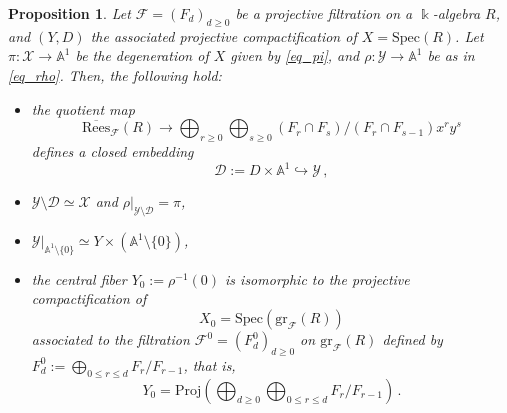 \documentclass[12pt,letterpaper, reqno]{amsart}
\newtheorem{proposition}[theorem]{Proposition}
\theoremstyle{defstyle} \newtheorem{definition}[theorem]{Definition}
\theoremstyle{remark}
\numberwithin{equation}{section}
\numberwithin{figure}{section}
\newcommand{\cF} {\mathcal{F}}
\newcommand{\Spec} {\mathrm{Spec}}
\newcommand{\Proj} {\mathrm{Proj}}
\newcommand{\gr} {\mathrm{gr}}
\newcommand{\kk} {\Bbbk}
\newcommand{\A} {\mathbb{A}}
\newcommand{\cY} {\mathcal{Y}}
\newcommand{\cD} {\mathcal{D}}
\newcommand{\cX} {\mathcal{X}}
\begin{document}
\begin{proposition} \label{prop_degeneration}
Let $\cF=(F_d)_{d\geq 0}$ be a projective filtration on a $\kk$-algebra $R$, and $(Y,D)$ the associated projective compactification of $X=\Spec(R)$. Let $\pi:\cX \rightarrow \A^1$ be the degeneration of $X$ given by \eqref{eq_pi}, and $\rho: \cY \rightarrow \A^1$ be as in \eqref{eq_rho}. Then, the following hold:
\begin{itemize}
    \item[(i)] the quotient map 
    \[ \overline{\mathrm{Rees}}_\cF(R) \longrightarrow \bigoplus_{r \geq 0} \bigoplus_{s \geq 0} (F_r \cap F_s)/(F_r \cap F_{s-1}) x^r y^s \]
    defines a closed embedding 
    \begin{equation} \label{eq_cD}
    \cD:= D \times \A^1 \hookrightarrow \cY\,,
    \end{equation}
    \item[(ii)] $\cY \setminus \cD  \simeq \cX$ and $\rho|_{\cY \setminus \cD} = \pi$,
    \item[(iii)] $\cY|_{\A^1 \setminus \{0\}} \simeq Y \times (\A^1 \setminus \{0\})$,
    \item[(iv)] the central fiber $Y_0 := \rho^{-1}(0)$ is isomorphic to the projective compactification of \[ X_0=\Spec(\gr_\cF(R))\] associated to the filtration $\cF^0=(F^0_d)_{d \geq 0}$ on $\gr_\cF(R)$ defined by $F^0_d := \bigoplus_{0 \leq r \leq d} F_r/F_{r-1}$, that is, 
    \[ Y_0 = \Proj \left( \bigoplus_{d \geq 0} \bigoplus_{0 \leq r \leq d} F_r/F_{r-1} \right) \,.\]
\end{itemize}
\end{proposition}
\end{document}
